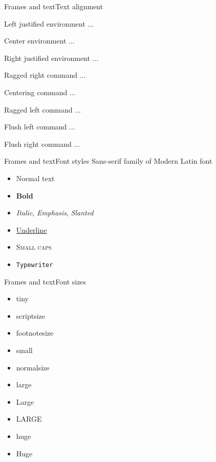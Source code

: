 \documentclass[aspectratio=169, 11pt]{beamer}
\begin{document}
\begin{frame}{Frames and text}{Text alignment}
	\begin{flushleft}
		Left justified 	environment ...
	\end{flushleft}
	\begin{center}
		Center environment ...
	\end{center}
	\begin{flushright}
		Right justified environment ...
	\end{flushright} 

\vspace{6pt}
\raggedright Ragged right command ...

\centering	Centering command ...

\raggedleft Ragged left command ...

\vspace{6pt}
\flushleft Flush left command ...

\flushright Flush right command ...
\end{frame}


\begin{frame}{Frames and text}{Font styles}
Sans-serif family of Modern Latin font
\begin{itemize}
	\item Normal text
	\item \textbf{Bold}
	\item \textit{Italic}, \emph{Emphasis}, \textsl{Slanted}
	\item \underline{Underline}
	\item \textsc{Small caps}
	\item \texttt{Typewriter}
\end{itemize}
\end{frame}


\begin{frame}{Frames and text}{Font sizes}
\begin{itemize}
	\item \tiny tiny
	\item \scriptsize scriptsize
	\item \footnotesize footnotesize
	\item \small small
	\item \normalsize normalsize
	\item \large large
	\item \Large Large
	\item \LARGE LARGE
	\item \huge huge
	\item \Huge Huge 
\end{itemize}
\end{frame} 
\end{document}
